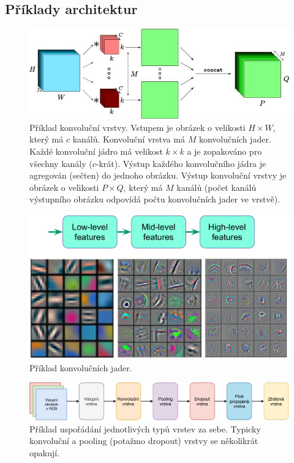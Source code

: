 \subsection{Příklady architektur}

\begin{figure}[H]
    \centering
    \includegraphics[width=1\linewidth]{conv_layers.png}
    \caption{Příklad konvoluční vrstvy. Vstupem je obrázek o velikosti $H \times W$, který má $c$ kanálů. Konvoluční vrstva má $M$ konvolučních jader. Každé konvoluční jádro má velikost $k \times k$ a je zopakováno pro všechny kanály ($c$-krát). Výstup každého konvolučního jádra je agregován (sečten) do jednoho obrázku. Výstup konvoluční vrstvy je obrázek o velikosti $P \times Q$, který má $M$ kanálů (počet kanálů výstupního obrázku odpovídá počtu konvolučních jader ve vrstvě).}
\end{figure}

\begin{figure}[H]
    \centering
    \includegraphics[width=0.75\linewidth]{conv-kernel.pdf}
    \caption{Příklad konvolučních jader.}
\end{figure}

\begin{figure}[H]
    \centering
    \includegraphics[width=1\linewidth]{conv-arch.pdf}
    \caption{Příklad uspořádání jednotlivých typů vrstev za sebe. Typicky konvoluční a pooling (potažmo dropout) vrstvy se několikrát opakují.}
\end{figure}

